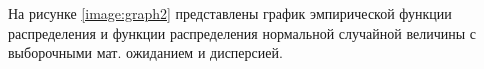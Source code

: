\clearpage
На рисунке \ref{image:graph2} представлены график эмпирической функции распределения и функции распределения нормальной случайной величины с выборочными мат. ожиданием и дисперсией.
\begin{figure}[h]
\end{figure}